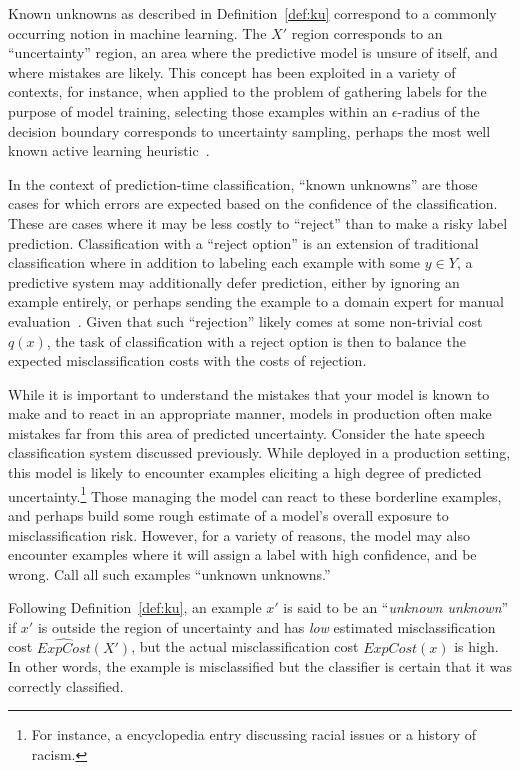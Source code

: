 Known unknowns as described in Definition~\ref{def:ku} correspond to a commonly occurring notion in machine learning. The $X'$ region corresponds to an ``uncertainty'' region, an area where the predictive model is unsure of itself, and where mistakes are likely. This concept has been exploited in a variety of contexts, for instance, when applied to the problem of gathering labels for the purpose of model training, selecting those examples within an $\epsilon$-radius of the decision boundary corresponds to uncertainty sampling, perhaps the most well known active learning heuristic~\cite{lewis94sequential}.

In the context of prediction-time classification, ``known unknowns'' are those cases for which errors are expected based on the confidence of the classification.   These are cases where it may be less costly to ``reject'' than to make a risky label prediction.  Classification with a ``reject option'' is an extension of traditional classification where in addition to labeling each example with some $y \in Y$, a predictive system may additionally defer prediction, either by ignoring an example entirely, or perhaps sending the example to a domain expert for manual evaluation~\cite{chow:57,chow:70}. Given that such ``rejection'' likely comes at some non-trivial cost $q(x)$, the task of classification with a reject option is then to balance the expected misclassification costs with the costs of rejection.  


While it is important to understand the mistakes that your model is known to make and to react in an appropriate manner, models in production often make mistakes far from this area of predicted uncertainty. Consider the hate speech classification system discussed previously. While deployed in a production setting, this model is likely to encounter examples eliciting a high degree of predicted uncertainty.\footnote{For instance, a encyclopedia entry discussing racial issues or a history of racism.} Those managing the model can react to these borderline examples, and perhaps build some rough estimate of a model's overall exposure to misclassification risk. However, for a variety of reasons, the model may also encounter examples where it will assign a label with high confidence, and be wrong. Call all such examples ``unknown unknowns.''

\begin{definition}
\label{def:uu}
Following Definition~\ref{def:ku}, an example $x'$ is said to be an ``\emph{unknown unknown}'' if $x'$ is outside the region of uncertainty and has \emph{low} estimated misclassification cost $\widehat{\mathit{ExpCost}}(X')$, but the actual misclassification cost $\mathit{ExpCost}(x)$ is high. In other words, the example is misclassified but the classifier is certain that it was correctly classified.
\end{definition}

